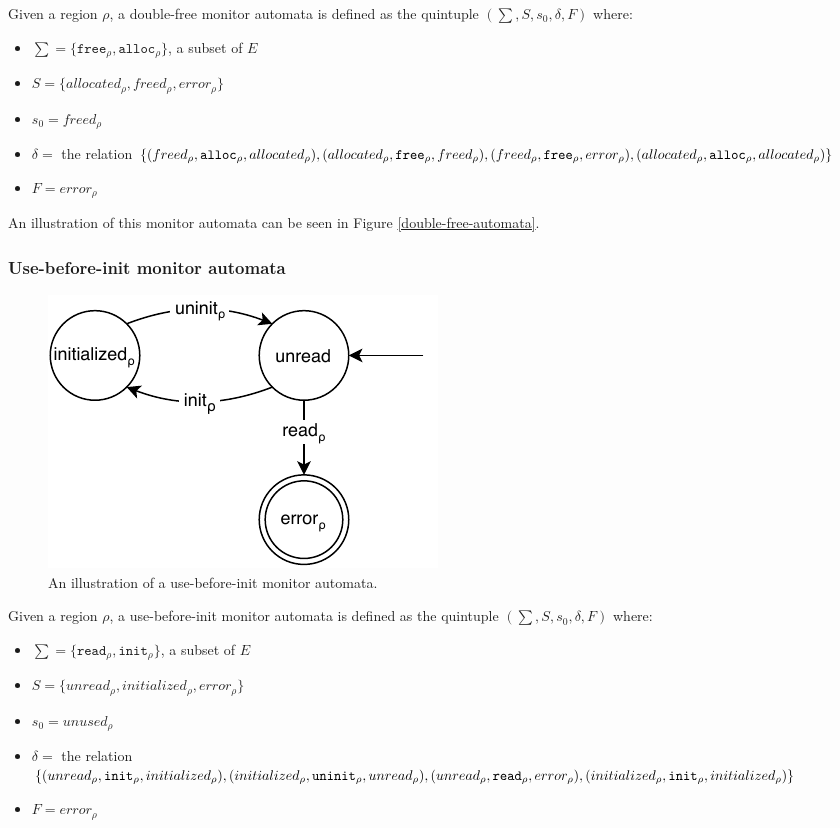 Given a region $\rho$, a double-free monitor automata is defined as the quintuple $(\sum, S, s_0, \delta, F)$ where: 

\begin{itemize}
    \item $\sum = \{\texttt{free}_\rho, \texttt{alloc}_\rho\}$, a subset of $E$
    \item $S = \{ allocated_\rho, freed_\rho, error_\rho \}$
    \item $s_0 = freed_\rho$ 
    \item $\delta =$ the relation $\{(freed_\rho, \texttt{alloc}_\rho, allocated_\rho), (allocated_\rho, \texttt{free}_\rho, freed_\rho), \\
    (freed_\rho, \texttt{free}_\rho, error_\rho), (allocated_\rho, \texttt{alloc}_\rho, allocated_\rho)\}$ 
    \item $F = error_\rho$  
\end{itemize}

An illustration of this monitor automata can be seen in Figure \ref{double-free-automata}. 

\subsubsection{Use-before-init monitor automata}

\begin{figure}[H]
    \centering
    \includegraphics[width=0.5\textwidth]{background/figures/use-before}
    \caption{An illustration of a use-before-init monitor automata.}
    \label{use-before-automata}
\end{figure}

Given a region $\rho$, a use-before-init monitor automata is defined as the quintuple $(\sum, S, s_0, \delta, F)$ where: 

\begin{itemize}
    \item $\sum = \{\texttt{read}_\rho, \texttt{init}_\rho\}$, a subset of $E$
    \item $S = \{ unread_\rho, initialized_\rho, error_\rho \}$
    \item $s_0 = unused_\rho$ 
    \item $\delta =$ the relation $\{(unread_\rho, \texttt{init}_\rho, initialized_\rho), (initialized_\rho, \texttt{uninit}_\rho, unread_\rho), \\
    (unread_\rho, \texttt{read}_\rho, error_\rho), (initialized_\rho, \texttt{init}_\rho, initialized_\rho)\}$ 
    \item $F = error_\rho$  
\end{itemize}

